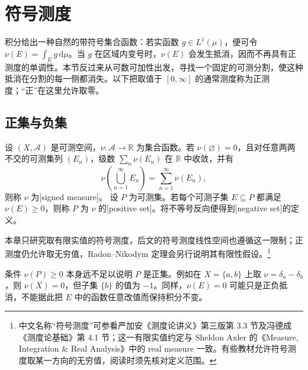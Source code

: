 \section{符号测度}
\label{b1:sec:0601}

积分给出一种自然的带符号集合函数：若实函数 \(g\in L^1(\mu)\)，便可令 \(\nu(E)=\int_E g\,\mathrm d\mu\)。当 \(g\) 在区域内变号时，\(\nu(E)\) 会发生抵消，因而不再具有正测度的单调性。本节反过来从可数可加性出发，寻找一个固定的可测分割，使这种抵消在分割的每一侧都消失。以下把取值于 \([0,\infty]\) 的通常测度称为正测度；“正”在这里允许取零。

\subsection{正集与负集}
\label{b1:subsec:060101}

\begin{definition}\label{b1:def:signed-measure}
设 \((X,\mathcal A)\) 是可测空间，\(\nu:\mathcal A\rightarrow\mathbb R\) 为集合函数。若 \(\nu(\varnothing)=0\)，且对任意两两不交的可测集列 \((E_n)\)，级数 \(\sum_n\nu(E_n)\) 在 \(\mathbb R\) 中收敛，并有
\[
\nu\left(\bigcup_{n=1}^{\infty}E_n\right)=\sum_{n=1}^{\infty}\nu(E_n),
\]
则称 \(\nu\) 为[signed measure]。
设 \(P\) 为可测集。若每个可测子集 \(E\subseteq P\) 都满足 \(\nu(E)\geq0\)，则称 \(P\) 为 \(\nu\) 的[positive set]。将不等号反向便得到[negative set]的定义。
\end{definition}

本章只研究取有限实值的符号测度，后文的符号测度线性空间也遵循这一限制；正测度仍允许取无穷值，Radon--Nikodym 定理会另行说明其有限性假设。\footnote{中文名称“符号测度”可参看严加安《测度论讲义》第三版\cite{Yan2021Cedulun}第 3.3 节及冯德成《测度论基础》\cite{Feng2023Cedulun}第 4.1 节；这一有限实值约定与 Sheldon Axler 的《Measure, Integration \& Real Analysis》\cite[Chapter 9]{Axler2020Measure}中的 real measure 一致。有些教材允许符号测度取某一方向的无穷值，阅读时须先核对定义范围。}

\ProseParagraphBreak

条件 \(\nu(P)\geq0\) 本身远不足以说明 \(P\) 是正集。例如在 \(X=\{a,b\}\) 上取 \(\nu=\delta_a-\delta_b\)，则 \(\nu(X)=0\)，但子集 \(\{b\}\) 的值为 \(-1\)。同样，\(\nu(E)=0\) 可能只是正负抵消，不能据此把 \(E\) 中的函数任意改值而保持积分不变。

